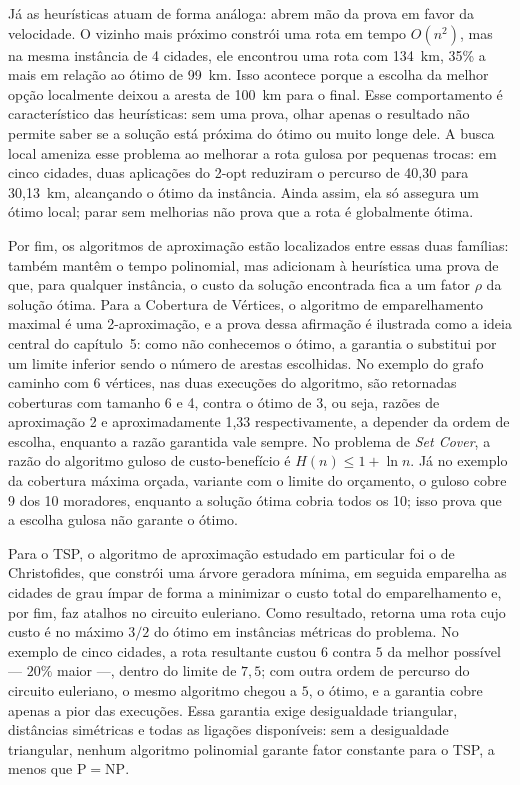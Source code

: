 Já as heurísticas atuam de forma análoga: abrem mão da prova em favor da velocidade. O vizinho mais próximo constrói uma rota em tempo $O(n^2)$, mas na mesma instância de 4 cidades, ele encontrou uma rota com 134~km, 35\% a mais em relação ao ótimo de 99~km. Isso acontece porque a escolha da melhor opção localmente deixou a aresta de 100~km para o final. Esse comportamento é característico das heurísticas: sem uma prova, olhar apenas o resultado não permite saber se a solução está próxima do ótimo ou muito longe dele. A busca local ameniza esse problema ao melhorar a rota gulosa por pequenas trocas: em cinco cidades, duas aplicações do 2-opt reduziram o percurso de 40,30 para 30,13~km, alcançando o ótimo da instância. Ainda assim, ela só assegura um ótimo local; parar sem melhorias não prova que a rota é globalmente ótima.

Por fim, os algoritmos de aproximação estão localizados entre essas duas famílias: também mantêm o tempo polinomial, mas adicionam à heurística uma prova de que, para qualquer instância, o custo da solução encontrada fica a um fator $\rho$ da solução ótima. Para a Cobertura de Vértices, o algoritmo de emparelhamento maximal é uma 2-aproximação, e a prova dessa afirmação é ilustrada como a ideia central do capítulo~5: como não conhecemos o ótimo, a garantia o substitui por um limite inferior sendo o número de arestas escolhidas. No exemplo do grafo caminho com 6 vértices, nas duas execuções do algoritmo, são retornadas coberturas com tamanho 6 e 4, contra o ótimo de 3, ou seja, razões de aproximação 2 e aproximadamente 1,33 respectivamente, a depender da ordem de escolha, enquanto a razão garantida vale sempre. No problema de \textit{Set Cover}, a razão do algoritmo guloso de custo-benefício é $H(n) \le 1 + \ln n$. Já no exemplo da cobertura máxima orçada, variante com o limite do orçamento, o guloso cobre 9 dos 10 moradores, enquanto a solução ótima cobria todos os 10; isso prova que a escolha gulosa não garante o ótimo.

Para o TSP, o algoritmo de aproximação estudado em particular foi o de Christofides, que constrói uma árvore geradora mínima, em seguida emparelha as cidades de grau ímpar de forma a minimizar o custo total do emparelhamento e, por fim, faz atalhos no circuito euleriano. Como resultado, retorna uma rota cujo custo é no máximo $3/2$ do ótimo em instâncias métricas do problema. No exemplo de cinco cidades, a rota resultante custou $6$ contra $5$ da melhor possível — $20\%$ maior —, dentro do limite de $7{,}5$; com outra ordem de percurso do circuito euleriano, o mesmo algoritmo chegou a $5$, o ótimo, e a garantia cobre apenas a pior das execuções. Essa garantia exige desigualdade triangular, distâncias simétricas e todas as ligações disponíveis: sem a desigualdade triangular, nenhum algoritmo polinomial garante fator constante para o TSP, a menos que $\mathrm{P} = \mathrm{NP}$.


